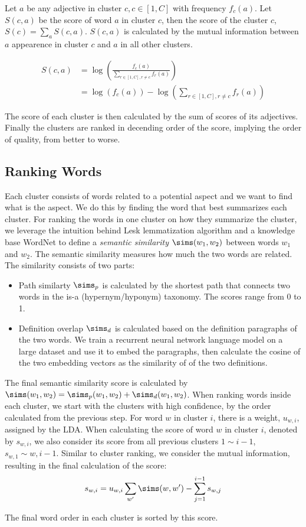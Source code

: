 Let $a$ be any adjective in cluster $c, c\in[1,C]$ with frequency $f_c(a)$. Let $S(c, a)$ be the score of word $a$ in cluster $c$, then the score of the cluster $c$, $S(c) = \sum_{a} S(c,a)$. $S(c,a)$ is calculated by the mutual information between $a$ appearence in cluster $c$ and $a$ in all other clusters.

\begin{align*}
	S(c, a) &= \log\left(\frac{f_c(a)}{\sum_{r\in[1, C], r\neq c} f_r(a)}\right) \\
			&= \log(f_c(a)) - \log(\sum_{r\in[1, C], r\neq c} f_r(a))
\end{align*}

The score of each cluster is then calculated by the sum of scores of its adjectives. Finally the clusters are ranked in decending order of the score, implying the order of quality, from better to worse.

\subsection{Ranking Words}

Each cluster consists of words related to a potential aspect and we want to find what is the aspect. We do this by finding the word that best summarizes each cluster. For ranking the words in one cluster on how they summarize the cluster, we leverage the intuition behind Lesk lemmatization algorithm and a knowledge base WordNet to define a \emph{semantic similarity} $\sims(w_1, w_2)$ between words $w_1$ and $w_2$.
The semantic similarity measures how much the two words are related. The similarity consists of two parts:

\begin{itemize}
    \item Path similarty $\sims_p$ is calculated by the shortest path that connects two words in the is-a (hypernym/hyponym) taxonomy. The scores range from 0 to 1.
    \item Definition overlap $\sims_d$ is calculated based on the definition paragraphs of the two words. We train a recurrent neural network language model on a large dataset and use it to embed the paragraphs, then calculate the cosine of the two embedding vectors as the similarity of of the two definitions.
\end{itemize}

The final semantic similarity score is calculated by $\sims(w_1, w_2) = \sims_p(w_1, w_2) + \sims_d(w_1, w_2)$. When ranking words inside each cluster, we start with the clusters with high confidence, by the order calculated from the previous step. For word $w$ in cluster $i$, there is a weight, $u_{w,i}$, assigned by the LDA. When calculating the score of word $w$ in cluster $i$, denoted by $s_{w,i}$, we also consider its score from all previous clusters $1\sim i-1$, $s_{w,1} \sim {w,i-1}$. Similar to cluster ranking, we consider the mutual information, resulting in the final calculation of the score:
$$s_{w,i} = u_{w,i} \sum_{w'} \sims(w, w') - \sum_{j=1}^{i-1} s_{w,j}$$

The final word order in each cluster is sorted by this score.
